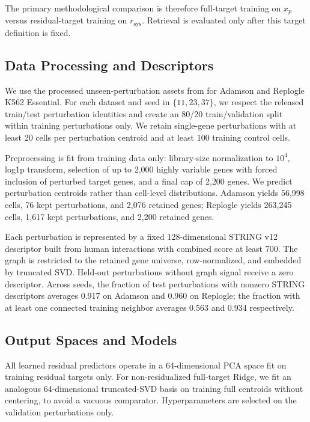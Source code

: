 \documentclass{article}
\newcommand{\xcent}[1]{x_{#1}}
\newcommand{\xpert}{\xcent{p}}
\newcommand{\rsys}{r_{\mathrm{sys}}}
\begin{document}
The primary methodological comparison is therefore full-target training on $\xpert$ versus residual-target training on $\rsys$. Retrieval is evaluated only after this target definition is fixed.

\subsection{Data Processing and Descriptors}

We use the processed unseen-perturbation assets from \citet{wei2026benchmarking} for Adamson and Replogle K562 Essential. For each dataset and seed in $\{11,23,37\}$, we respect the released train/test perturbation identities and create an 80/20 train/validation split within training perturbations only. We retain single-gene perturbations with at least 20 cells per perturbation centroid and at least 100 training control cells.

Preprocessing is fit from training data only: library-size normalization to $10^4$, log1p transform, selection of up to 2{,}000 highly variable genes with forced inclusion of perturbed target genes, and a final cap of 2{,}200 genes. We predict perturbation centroids rather than cell-level distributions. Adamson yields 56{,}998 cells, 76 kept perturbations, and 2{,}076 retained genes; Replogle yields 263{,}245 cells, 1{,}617 kept perturbations, and 2{,}200 retained genes.

Each perturbation is represented by a fixed 128-dimensional STRING v12 descriptor built from human interactions with combined score at least 700. The graph is restricted to the retained gene universe, row-normalized, and embedded by truncated SVD. Held-out perturbations without graph signal receive a zero descriptor. Across seeds, the fraction of test perturbations with nonzero STRING descriptors averages 0.917 on Adamson and 0.960 on Replogle; the fraction with at least one connected training neighbor averages 0.563 and 0.934 respectively.

\subsection{Output Spaces and Models}

All learned residual predictors operate in a 64-dimensional PCA space fit on training residual targets only. For non-residualized full-target Ridge, we fit an analogous 64-dimensional truncated-SVD basis on training full centroids without centering, to avoid a vacuous comparator. Hyperparameters are selected on the validation perturbations only.
\end{document}

